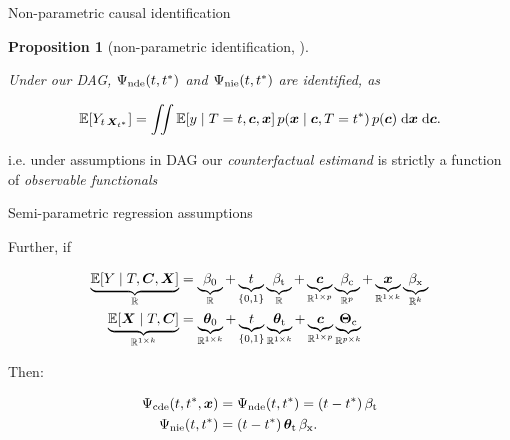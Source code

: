 \documentclass{beamer}
\newtheorem{proposition}{Proposition}
\theoremstyle{remark}
\renewcommand{\c}{\bm c}
\newcommand{\x}{\bm x}
\newcommand{\C}{\bm C}
\newcommand{\X}{\bm X}
\newcommand{\thetazero}{\bm \theta_0}
\newcommand{\thetat}{\bm \theta_\text{t}}
\newcommand{\Thetac}{\bm \Theta_\text{c}}
\newcommand{\betazero}{\beta_0}
\newcommand{\betat}{\beta_\text{t}}
\newcommand{\betac}{\beta_\text{c}}
\newcommand{\betax}{\beta_\text{x}}
\newcommand{\cde}{\Psi_\text{cde} \paren*{t, t^*, \x}}
\newcommand{\nde}{\Psi_\text{nde} \paren*{t, t^*}}
\newcommand{\nie}{\Psi_\text{nie} \paren*{t, t^*}}
\newcommand \cond {\mid}
\DeclarePairedDelimiter{\paren}{(}{)}
\DeclarePairedDelimiter{\brac}{[}{]}
\newcommand{\dx}[1][]{%
   \ifthenelse{ \equal{#1}{} }
      {\ensuremath{\;\mathrm{d}x}}
      {\ensuremath{\;\mathrm{d}#1}}
}
\newcommand{\E}[2][]{%
   \ifthenelse{ \equal{#1}{} }
      {\ensuremath{\mathbb{E} \brac*{#2}}}
      {\ensuremath{\mathbb{E} \brac*{#2 \mid #1}}}
}
\begin{document}
\begin{frame}{Non-parametric causal identification}

    \begin{proposition}[non-parametric identification, \cite{imai_identification_2010}]
        \label{prop:non-parametric-identification}

        Under our DAG, $\nde$ and $\nie$ are identified, as

        \begin{align*}
            \label{eq:non-param-nested}
            \E{Y_{t \, \X_{t^*}}}
            = \iint \E[T = t, \c, \x]{y} \, p(\x \cond \c, T = t^*) \, p(\c) \dx[\x] \dx[\c].
        \end{align*}

    \end{proposition}

    i.e. under assumptions in DAG our \emph{counterfactual estimand} is strictly a function of \emph{observable functionals}

\end{frame}

\begin{frame}{Semi-parametric regression assumptions}

    Further, if

    \begin{align*}
        \underbrace{\E[T, \C, \X]{Y}}_{\mathbb R}
         & = \underbrace{\betazero}_{\mathbb R}
        + \underbrace{t}_{\{0, 1\}} \underbrace{\betat}_{\mathbb R}
        + \underbrace{\c}_{\mathbb R^{1 \times p}} \underbrace{\betac}_{\mathbb R^p}
        + \underbrace{\x}_{\mathbb R^{1 \times k}} \underbrace{\betax}_{\mathbb R^k} \\
        \underbrace{\E[T, \C]{\X}}_{\mathbb R^{1 \times k}}
         & = \underbrace{\thetazero}_{\mathbb R^{1 \times k}}
        + \underbrace{t}_{\{0, 1\}} \underbrace{\thetat}_{\mathbb R^{1 \times k}}
        + \underbrace{\c}_{\mathbb R^{1 \times p}} \underbrace{\Thetac}_{\mathbb R^{p \times k}}
    \end{align*}

    Then:

    \begin{align*}
        \cde & = \nde = \paren*{t - t^*} \, \betat      \\
        \nie & = \paren*{t - t^*} \, \thetat \, \betax.
    \end{align*}

\end{frame}
\end{document}
